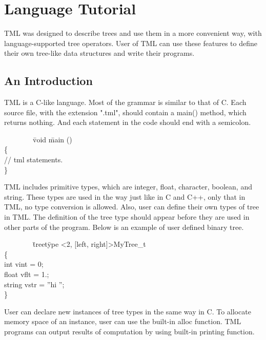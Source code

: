 \documentclass[12pt,psfig,a4]{article}
\begin{document}
\pagebreak
\section{Language Tutorial}
TML was designed to describe trees and use them in a more convenient way, with language-supported tree operators. User of TML can use these features to define their own tree-like data structures and write their programs.

\subsection{An Introduction}
TML is a C-like language. Most of the grammar is similar to that of C. Each source file, with the extension ".tml", should contain a main() method, which returns nothing. And each statement in the code should end with a semicolon.

\begin{code}
\begin{tabbing}
~~~~~~~~\= void \=main () \\
\> \{ \\
\> \> // tml statements.\\
\> \}
\end{tabbing}
\end{code}

TML includes primitive types, which are integer, float, character, boolean, and string. These types are used in the way just like in C and C++, only that in TML, no type conversion is allowed. Also, user can define their own types of tree in TML. The definition of the tree type should appear before they are used in other parts of the program. Below is an example of user defined binary tree.

\begin{code}
\begin{tabbing}
~~~~~~~~\= treet\=ype \textless2, [left, right]\textgreater MyTree\_t \\
\> \{ \\
\> \>int vint = 0;\\
\> \>float vflt = 1.;\\
\> \>string vstr = ''hi '';\\
\> \}
\end{tabbing}
\end{code}

User can declare new instances of tree types in the same way in C. To allocate memory space of an instance, user can use the built-in alloc function.
TML programs can output results of computation by using built-in printing function.
\end{document}
